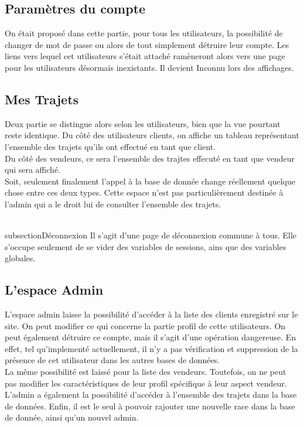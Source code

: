 \documentclass{article}
\begin{document}
\subsection{Paramètres du compte}
On était proposé dans cette partie, pour tous les utilisateurs, la possibilité de changer de mot de passe ou alors de tout simplement détruire leur compte. 
Les liens vers lequel cet utilisateurs s'était attaché ramèneront alors vers une page pour les utilisateurs désormais inexistants. Il devient Inconnu lors des affichages. 

\subsection{Mes Trajets}
Deux partie se distingue alors selon les utilisateurs, bien que la vue pourtant reste identique. 
Du côté des utilisateurs clients, on affiche un tableau représentant l'ensemble des trajets qu'ils ont effectué en tant que client. 
\\
Du côté des vendeurs, ce sera l'ensemble des trajtes effecuté en tant que vendeur qui sera affiché. 
\\ 
Soit, seulement finalement l'appel à la base de donnée change réellement quelque chose entre ces deux types. 
Cette espace n'est pas particulièrement destinée à l'admin qui a le droit lui de consulter l'ensemble des trajets. 

\\subsection{Déconnexion}
Il s'agit d'une page de déconnexion commune à tous. Elle s'occupe seulement de se vider des variables de sessions, ains que des variables globales. 

\subsection{L'espace Admin}

L'espace admin laisse la possibilité d'accéder à la liste des clients enregistré sur le site. On peut modifier ce qui concerne la partie profil de cette utilisateurs. 
On peut également détruire ce compte, mais il s'agit d'une opération dangereuse. En effet, tel qu'implementé actuellement, il n'y a pas vérification et suppression de la présence de cet utilisateur dans les autres bases de données.
\\
La même possibilité est laissé pour la liste des vendeurs. Toutefois, on ne peut pas modifier les caractéristiques de leur profil spécifique à leur aspect vendeur. 
\\
L'admin a également la possibilité d'accéder à l'ensemble des trajets dans la base de données. 
Enfin, il est le seul à pouvoir rajouter une nouvelle race dans la base de donnée, ainsi qu'un nouvel admin.
\end{document}
